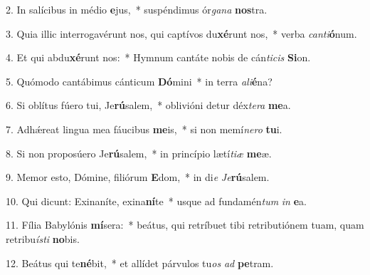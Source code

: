 2. In salícibus in médio \textbf{e}jus,~*  suspéndimus ór\textit{ga}\textit{na} \textbf{nos}tra.\

3. Quia illic interrogavérunt nos, qui captívos du\textbf{xé}runt nos,~*  verba \textit{can}\textit{ti}\textbf{ó}num.\

4. Et qui abdu\textbf{xé}runt nos:~*  Hymnum cantáte nobis de cán\textit{ti}\textit{cis} \textbf{Si}on.\

5. Quómodo cantábimus cánticum \textbf{Dó}mini~*  in terra \textit{a}\textit{li}\textbf{é}na?\

6. Si oblítus fúero tui, Je\textbf{rú}salem,~*  oblivióni detur déx\textit{te}\textit{ra} \textbf{me}a.\

7. Adhǽreat lingua mea fáucibus \textbf{me}is,~*  si non memí\textit{ne}\textit{ro} \textbf{tu}i.\

8. Si non proposúero Je\textbf{rú}salem,~*  in princípio lætí\textit{ti}\textit{æ} \textbf{me}æ.\

9. Memor esto, Dómine, filiórum \textbf{E}dom,~*  in di\textit{e} \textit{Je}\textbf{rú}salem.\

10. Qui dicunt: Exinaníte, exina\textbf{ní}te~*  usque ad fundamén\textit{tum} \textit{in} \textbf{e}a.\

11. Fília Babylónis \textbf{mí}sera:~*  beátus, qui retríbuet tibi retributiónem tuam, quam retribu\textit{ís}\textit{ti} \textbf{no}bis.\

12. Beátus qui te\textbf{né}bit,~*  et allídet párvulos tu\textit{os} \textit{ad} \textbf{pe}tram.\

